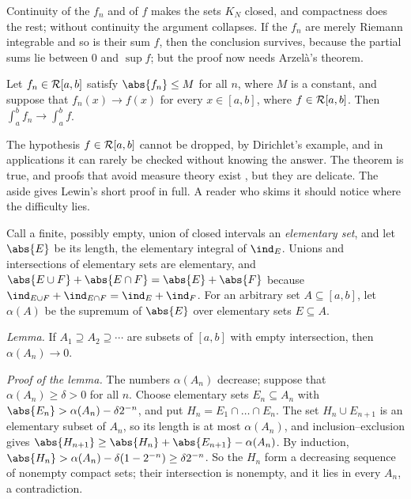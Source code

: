 \begin{refsection}
Continuity of the $f_n$ and of $f$ makes the sets $K_N$ closed, and compactness does the rest; without continuity the argument collapses. If the $f_n$ are merely Riemann integrable and so is their sum $f$, then the conclusion survives, because the partial sums lie between $0$ and $\sup f$; but the proof now needs Arzelà's theorem.

\begin{theorem}\label{thm:lebesgue:arzela}
Let $f_n\in\mathcal{R}[a,b]$ satisfy $\abs{f_n}\le M$ for all $n$, where $M$ is a constant, and suppose that $f_n(x)\to f(x)$ for every $x\in[a,b]$, where $f\in\mathcal{R}[a,b]$. Then $\int_a^b f_n\to\int_a^b f$.
\end{theorem}

The hypothesis $f\in\mathcal{R}[a,b]$ cannot be dropped, by Dirichlet's example, and in applications it can rarely be checked without knowing the answer. The theorem is true, and proofs that avoid measure theory exist \parencite{Luxemburg1971,Lewin1986}, but they are delicate. The aside gives Lewin's short proof in full. A reader who skims it should notice where the difficulty lies.

\begin{aside}
Call a finite, possibly empty, union of closed intervals an \emph{elementary set}, and let $\abs{E}$ be its length, the elementary integral of $\ind_E$. Unions and intersections of elementary sets are elementary, and $\abs{E\cup F}+\abs{E\cap F}=\abs{E}+\abs{F}$ because $\ind_{E\cup F}+\ind_{E\cap F}=\ind_E+\ind_F$. For an arbitrary set $A\subseteq[a,b]$, let $\alpha(A)$ be the supremum of $\abs{E}$ over elementary sets $E\subseteq A$.

\emph{Lemma.} If $A_1\supseteq A_2\supseteq\cdots$ are subsets of $[a,b]$ with empty intersection, then $\alpha(A_n)\to0$.

\emph{Proof of the lemma.} The numbers $\alpha(A_n)$ decrease; suppose that $\alpha(A_n)\ge\delta>0$ for all $n$. Choose elementary sets $E_n\subseteq A_n$ with $\abs{E_n}>\alpha(A_n)-\delta2^{-n}$, and put $H_n=E_1\cap\dots\cap E_n$. The set $H_n\cup E_{n+1}$ is an elementary subset of $A_n$, so its length is at most $\alpha(A_n)$, and inclusion--exclusion gives $\abs{H_{n+1}}\ge\abs{H_n}+\abs{E_{n+1}}-\alpha(A_n)$. By induction, $\abs{H_n}>\alpha(A_n)-\delta(1-2^{-n})\ge\delta2^{-n}$. So the $H_n$ form a decreasing sequence of nonempty compact sets; their intersection is nonempty, and it lies in every $A_n$, a contradiction.


\end{aside}
\end{refsection}

